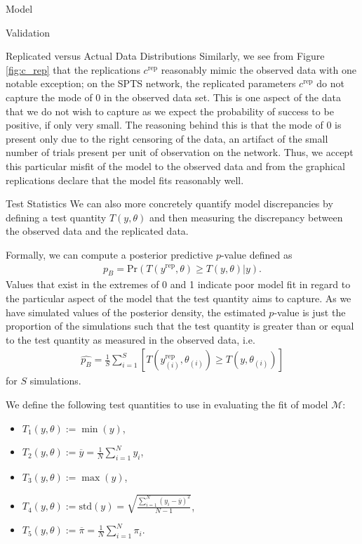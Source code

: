 \begin{chapter}{Model}
\begin{section}{Validation}
\begin{subsection}{Replicated versus Actual Data Distributions}
    Similarly, we see from Figure \ref{fig:c_rep} that the replications $c^{\text{rep}}$
    reasonably mimic the observed data with one notable exception; on the SPTS network,
    the replicated parameters $c^\text{rep}$ do not capture the mode of 0 in the observed data set.
    This is one aspect of the data that we do not wish to capture as we expect the probability
    of success to be positive, if only very small. The reasoning behind this is
    that the mode of 0 is present only due to the right censoring of the data, an artifact
    of the small number of trials present per unit of observation on the network. Thus, we accept this
    particular misfit of the model to the observed data and from the graphical replications
    declare that the model fits reasonably well.
  \end{subsection}

  \begin{subsection}{Test Statistics}\label{sec:test}
    We can also more concretely quantify model discrepancies by defining a test quantity $T(y, \theta)$
    and then measuring the discrepancy between the observed data and the replicated data.

    Formally, we can compute a posterior predictive $p$-value defined as
    \begin{align}\label{form:bayesp}
      p_B = \text{Pr}\left( T(y^{\text{rep}}, \theta) \geq T(y, \theta)  | y \right).
    \end{align}
    Values that exist in the extremes of 0 and 1 indicate poor model fit in regard to the particular
    aspect of the model that the test quantity aims to capture.
    As we have simulated values of the posterior density, the estimated $p$-value is
    just the proportion of the simulations such that the test quantity is greater than or equal
    to the test quantity as measured in the observed data, i.e.\
    \begin{align*}
      \hat{p_B} = \frac{1}{S}\sum_{i=1}^S [T(y_{(i)}^{\text{rep}}, \theta_{(i)}) \geq T(y, \theta_{(i)})]
    \end{align*}
    for $S$ simulations.

    We define the following test quantities to use in evaluating the fit of model $\mathcal{M}$:
    \begin{itemize}
      \item $T_1(y, \theta):= \min(y)$,
      \item $T_2(y, \theta):= \overline{y} = \frac{1}{N}\sum_{i=1}^N y_i$,
      \item $T_3(y, \theta):= \max(y)$,
      \item $T_4(y, \theta):= \text{std}(y) = \sqrt {\frac {\sum _{i=1}^{N}(y_{i}- \overline {y})^{2}}{N-1}}$,
      \item $T_5(y, \theta) := \overline{\pi} = \frac{1}{N}\sum_{i=1}^N \pi_i$.
    \end{itemize}


\end{subsection}
\end{section}
\end{chapter}
